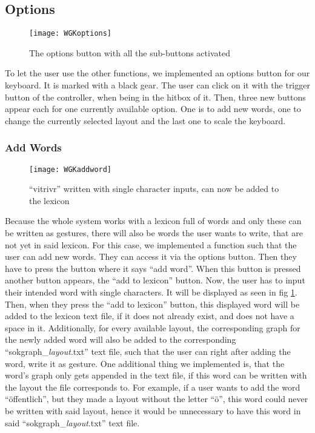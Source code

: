 \subsection{Options}

\begin{figure}
\centering
\texttt{[image: WGKoptions]}
\caption{The options button with all the sub-buttons activated}
\end{figure}

To let the user use the other functions, we implemented an options button for our keyboard. It is marked with a black gear. The user can click on it with the trigger button of the controller, when being in the hitbox of it. Then, three new buttons appear each for one currently available option. One is to add new words, one to change the currently selected layout and the last one to scale the keyboard.

\subsubsection{Add Words}
\begin{figure}
    \centering
    \texttt{[image: WGKaddword]}
    \caption{``vitrivr'' written with single character inputs, can now be added to the lexicon}
    \label{fig:addword}
\end{figure}
Because the whole system works with a lexicon full of words and only these can be written as gestures, there will also be words the user wants to write, that are not yet in said lexicon. For this case, we implemented a function such that the user can add new words. They can access it via the options button. Then they have to press the button where it says ``add word''. When this button is pressed another button appears, the ``add to lexicon'' button. Now, the user has to input their intended word with single characters. It will be displayed as seen in fig \ref{fig:addword}. Then, when they press the ``add to lexicon'' button, this displayed word will be added to the lexicon text file, if it does not already exist, and does not have a space in it. Additionally, for every available layout, the corresponding graph for the newly added word will also be added to the corresponding ``sokgraph\_\textit{layout}.txt'' text file, such that the user can right after adding the word, write it as gesture. One additional thing we implemented is, that the word's graph only gets appended in the text file, if this word can be written with the layout the file corresponds to. For example, if a user wants to add the word ``öffentlich'', but they made a layout without the letter ``ö'', this word could never be written with said layout, hence it would be unnecessary to have this word in said ``sokgraph\_\textit{layout}.txt'' text file.


